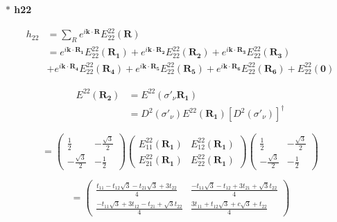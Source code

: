 \documentclass{article}
\begin{document}
\noindent\textbf{ $\ast$ h22}

\begin{align*}
	h_{22} & = \sum_{R}^{} e^{i\mathbf{k\cdot R}} E^{22}_{22}(\textbf{R})                                                                                                                                \\
	       & =  e^{i\mathbf{k\cdot R_1}} E^{22}_{22}(\mathbf{R_1}) +  e^{i\mathbf{k\cdot R_2}} E^{22}_{22}(\mathbf{R_2}) +  e^{i\mathbf{k\cdot R_3}} E^{22}_{22}(\mathbf{R_3})                           \\
	       & +  e^{i\mathbf{k\cdot R_4}} E^{22}_{22}(\mathbf{R_4}) +  e^{i\mathbf{k\cdot R_5}} E^{22}_{22}(\mathbf{R_5}) +  e^{i\mathbf{k\cdot R_6}} E^{22}_{22}(\mathbf{R_6}) + E^{22}_{22}(\mathbf{0})
\end{align*}

\begin{align*}
	E^{22} (\mathbf{R_2})
	 & =  E^{22} (\sigma'_\nu \mathbf{R_1})                                             \\
	 & = D^2(\sigma'_\nu)  E^{22}(\mathbf{R_1}) \left[ D^2(\sigma'_\nu) \right]^\dagger
\end{align*}

\[
	\renewcommand{\arraystretch}{0.75}
	=
	\begin{pmatrix}
		\frac{1}{2}         & -\frac{\sqrt{3}}{2} \\
		-\frac{\sqrt{3}}{2} & -\frac{1}{2}
	\end{pmatrix}
	\begin{pmatrix}
		E_{11}^{22}(\mathbf{R_1}) & E_{12}^{22}(\mathbf{R_1}) \\
		E_{21}^{22}(\mathbf{R_1}) & E_{22}^{22}(\mathbf{R_1})
	\end{pmatrix}
	\begin{pmatrix}
		\frac{1}{2}         & -\frac{\sqrt{3}}{2} \\
		-\frac{\sqrt{3}}{2} & -\frac{1}{2}
	\end{pmatrix}
\]

\[
	\renewcommand{\arraystretch}{0.75}
	=
	\begin{pmatrix}
		\frac{t_{11} - t_{12}\sqrt{3} -t_{21}\sqrt{3} + 3t_{22}}{4}   & \frac{-t_{11}\sqrt{3} - t_{12} + 3t_{21} + \sqrt{3}t_{22}}{4} \\
		\frac{-t_{11}\sqrt{3} + 3t_{12} - t_{21} + \sqrt{3}t_{22}}{4} & \frac{3t_{11} + t_{12}\sqrt{3} + c\sqrt{3} + t_{22}}{4}
	\end{pmatrix}
\]
\end{document}
